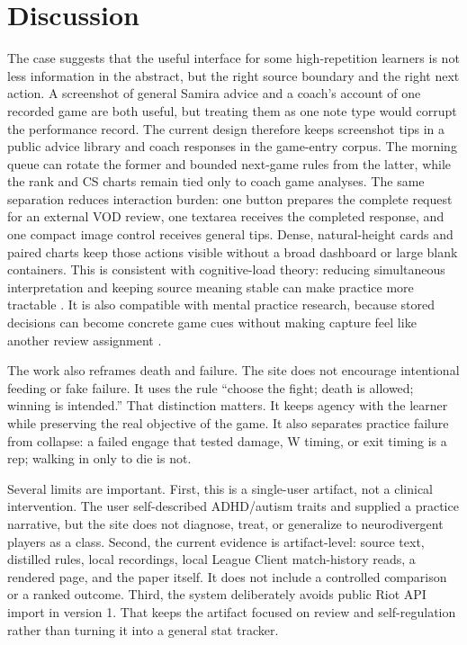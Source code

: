 \documentclass[12pt,letterpaper]{article}
\begin{document}
\section{Discussion}

The case suggests that the useful interface for some high-repetition learners is not less information in the abstract, but the right source boundary and the right next action. A screenshot of general Samira advice and a coach's account of one recorded game are both useful, but treating them as one note type would corrupt the performance record. The current design therefore keeps screenshot tips in a public advice library and coach responses in the game-entry corpus. The morning queue can rotate the former and bounded next-game rules from the latter, while the rank and CS charts remain tied only to coach game analyses. The same separation reduces interaction burden: one button prepares the complete request for an external VOD review, one textarea receives the completed response, and one compact image control receives general tips. Dense, natural-height cards and paired charts keep those actions visible without a broad dashboard or large blank containers. This is consistent with cognitive-load theory: reducing simultaneous interpretation and keeping source meaning stable can make practice more tractable \cite{sweller1988}. It is also compatible with mental practice research, because stored decisions can become concrete game cues without making capture feel like another review assignment \cite{driskell1994}.

The work also reframes death and failure. The site does not encourage intentional feeding or fake failure. It uses the rule ``choose the fight; death is allowed; winning is intended.'' That distinction matters. It keeps agency with the learner while preserving the real objective of the game. It also separates practice failure from collapse: a failed engage that tested damage, W timing, or exit timing is a rep; walking in only to die is not.

Several limits are important. First, this is a single-user artifact, not a clinical intervention. The user self-described ADHD/autism traits and supplied a practice narrative, but the site does not diagnose, treat, or generalize to neurodivergent players as a class. Second, the current evidence is artifact-level: source text, distilled rules, local recordings, local League Client match-history reads, a rendered page, and the paper itself. It does not include a controlled comparison or a ranked outcome. Third, the system deliberately avoids public Riot API import in version 1. That keeps the artifact focused on review and self-regulation rather than turning it into a general stat tracker.
\end{document}
